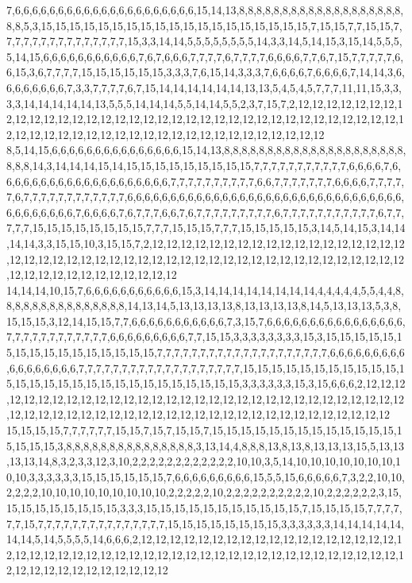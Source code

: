 7,6,6,6,6,6,6,6,6,6,6,6,6,6,6,6,6,6,6,6,6,6,15,14,13,8,8,8,8,8,8,8,8,8,8,8,8,8,8,8,8,8,8,8,8,8,5,3,15,15,15,15,15,15,15,15,15,15,15,15,15,15,15,15,15,15,15,7,15,15,7,7,15,15,7,7,7,7,7,7,7,7,7,7,7,7,7,7,7,15,3,3,14,14,5,5,5,5,5,5,5,5,14,3,3,14,5,14,15,3,15,14,5,5,5,5,14,15,6,6,6,6,6,6,6,6,6,6,6,7,6,7,6,6,6,7,7,7,7,6,7,7,7,7,6,6,6,6,7,7,6,7,15,7,7,7,7,7,6,6,15,3,6,7,7,7,7,15,15,15,15,15,15,3,3,3,7,6,15,14,3,3,3,7,6,6,6,6,7,6,6,6,6,7,14,14,3,6,6,6,6,6,6,6,6,7,3,3,7,7,7,7,6,7,15,14,14,14,14,14,14,13,13,5,4,5,4,5,7,7,7,11,11,15,3,3,3,3,14,14,14,14,14,13,5,5,5,14,14,14,5,5,14,14,5,5,2,3,7,15,7,2,12,12,12,12,12,12,12,12,12,12,12,12,12,12,12,12,12,12,12,12,12,12,12,12,12,12,12,12,12,12,12,12,12,12,12,12,12,12,12,12,12,12,12,12,12,12,12,12,12,12,12,12,12,12,12,12,12,12
8,5,14,15,6,6,6,6,6,6,6,6,6,6,6,6,6,6,6,15,14,13,8,8,8,8,8,8,8,8,8,8,8,8,8,8,8,8,8,8,8,8,8,8,8,8,14,3,14,14,14,15,14,15,15,15,15,15,15,15,15,15,7,7,7,7,7,7,7,7,7,7,7,6,6,6,6,7,6,6,6,6,6,6,6,6,6,6,6,6,6,6,6,6,6,6,6,6,7,7,7,7,7,7,7,7,7,7,6,6,7,7,7,7,7,7,7,6,6,6,6,7,7,7,7,7,6,7,7,7,7,7,7,7,7,7,7,7,7,6,6,6,6,6,6,6,6,6,6,6,6,6,6,6,6,6,6,6,6,6,6,6,6,6,6,6,6,6,6,6,6,6,6,6,6,6,6,6,6,7,6,6,6,6,7,6,7,7,7,6,6,7,6,7,7,7,7,7,7,7,7,7,6,7,7,7,7,7,7,7,7,7,7,7,6,7,7,7,7,7,15,15,15,15,15,15,15,15,7,7,7,15,15,15,7,7,7,15,15,15,15,15,3,14,5,14,15,3,14,14,14,14,3,3,15,15,10,3,15,15,7,2,12,12,12,12,12,12,12,12,12,12,12,12,12,12,12,12,12,12,12,12,12,12,12,12,12,12,12,12,12,12,12,12,12,12,12,12,12,12,12,12,12,12,12,12,12,12,12,12,12,12,12,12,12,12,12,12,12,12
14,14,14,10,15,7,6,6,6,6,6,6,6,6,6,6,6,15,3,14,14,14,14,14,14,14,14,4,4,4,4,4,5,5,4,4,8,8,8,8,8,8,8,8,8,8,8,8,8,8,8,14,13,14,5,13,13,13,13,8,13,13,13,13,8,14,5,13,13,13,5,3,8,15,15,15,3,12,14,15,15,7,7,6,6,6,6,6,6,6,6,6,6,6,7,3,15,7,6,6,6,6,6,6,6,6,6,6,6,6,6,6,6,6,7,7,7,7,7,7,7,7,7,7,7,7,6,6,6,6,6,6,6,6,6,7,7,15,15,3,3,3,3,3,3,3,3,15,3,15,15,15,15,15,15,15,15,15,15,15,15,15,15,15,15,7,7,7,7,7,7,7,7,7,7,7,7,7,7,7,7,7,7,7,7,6,6,6,6,6,6,6,6,6,6,6,6,6,6,6,6,6,7,7,7,7,7,7,7,7,7,7,7,7,7,7,7,7,7,7,7,15,15,15,15,15,15,15,15,15,15,15,15,15,15,15,15,15,15,15,15,15,15,15,15,15,15,15,15,3,3,3,3,3,3,15,3,15,6,6,6,2,12,12,12,12,12,12,12,12,12,12,12,12,12,12,12,12,12,12,12,12,12,12,12,12,12,12,12,12,12,12,12,12,12,12,12,12,12,12,12,12,12,12,12,12,12,12,12,12,12,12,12,12,12,12,12,12,12,12
15,15,15,15,7,7,7,7,7,7,15,15,7,15,7,15,15,7,15,15,15,15,15,15,15,15,15,15,15,15,15,15,15,15,15,3,8,8,8,8,8,8,8,8,8,8,8,8,8,8,8,3,13,14,4,8,8,8,13,8,13,8,13,13,13,15,5,13,13,13,13,14,8,3,2,3,3,12,3,10,2,2,2,2,2,2,2,2,2,2,2,2,10,10,3,5,14,10,10,10,10,10,10,10,10,10,3,3,3,3,3,3,15,15,15,15,15,15,7,6,6,6,6,6,6,6,6,6,15,5,5,15,6,6,6,6,6,7,3,2,2,10,10,2,2,2,2,10,10,10,10,10,10,10,10,10,2,2,2,2,2,10,2,2,2,2,2,2,2,2,2,2,10,2,2,2,2,2,2,3,15,15,15,15,15,15,15,15,15,3,3,3,15,15,15,15,15,15,15,15,15,15,15,7,15,15,15,15,7,7,7,7,7,7,15,7,7,7,7,7,7,7,7,7,7,7,7,7,7,7,15,15,15,15,15,15,15,15,3,3,3,3,3,3,14,14,14,14,14,14,14,5,14,5,5,5,5,14,6,6,6,2,12,12,12,12,12,12,12,12,12,12,12,12,12,12,12,12,12,12,12,12,12,12,12,12,12,12,12,12,12,12,12,12,12,12,12,12,12,12,12,12,12,12,12,12,12,12,12,12,12,12,12,12,12,12,12,12,12,12
